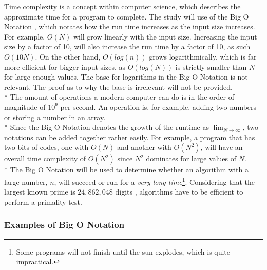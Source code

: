 \documentclass[main.tex]{subfiles}
\begin{document}
Time complexity \cite{theorem:time_comp} is a concept within computer science,
which describes the approximate time for a program to complete. The study will
use of the Big O Notation \cite{theorem:big_O}, which notates how the run time
increases as the input size increases. For example, $O(N)$ will grow linearly
with the input size. Increasing the input size by a factor of 10, will also
increase the run time by a factor of 10, as such $O(10N)$. On the other hand,
$O(log(n))$ grows logarithmically, which is far more efficient for bigger input
sizes, as $O(log(N))$ is strictly smaller than $N$ for large enough values. The
base for logarithms in the Big O Notation is not relevant. The proof as to why
the base is irrelevant will not be provided. \newline
\\*
The amount of operations a modern computer can do is in the order of magnitude
of $10^{9}$ per second. An operation is, for example, adding two numbers or
storing a number in an array. \newline
\\*
Since the Big O Notation denotes the growth of the runtime as
$\lim_{N\to\infty}$, two notations can be added together rather easily. For
example, a program that has two bits of codes, one with $O(N)$ and another with
$O(N^{2})$, will have an overall time complexity of $O(N^{2})$ since $N^{2}$
dominates for large values of $N$. \newline
\\*
The Big O Notation will be used to determine whether an algorithm with a large
number, $n$, will succeed or run for a \textit{very long time}\footnote{Some
  programs will not finish until the sun explodes, which is quite impractical.}.
Considering that the largest known prime is $24,862,048$ digits
\cite{prime:largest_digits}, algorithms have to be efficient to perform a
primality test.

\newpage
\subsubsection{Examples of Big O Notation}
\end{document}
